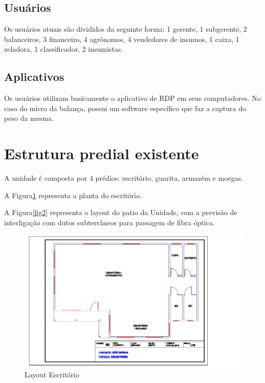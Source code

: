 \documentclass[	DIV=calc,%
							paper=a4,%
							fontsize=12pt,%
							onecolumn]{scrartcl}	 					%
\begin{document}
\subsection{Usuários}
Os usuários atuais são divididos da seguinte forma: 1 gerente, 1 subgerente, 2 balanceiros, 3 financeiro, 4 agrônomos, 4 vendedores de insumos, 1 caixa, 1 zeladora, 1 classificador, 2 insumistas.

\subsection{Aplicativos}
Os usuários utilizam basicamente o aplicativo de RDP em seus computadores. No caso do micro da balança, possui um software específico que faz a captura do peso da mesma.

\section{Estrutura predial existente}

A unidade é composta por 4 prédios: escritório, guarita, armazém e moegas.

A Figura\ref{fig1} representa a planta do escritório. 

A Figura\ref{fig2} representa o layout do patio da Unidade, com a previsão de interligação com dutos subterrâneos para passagem de fibra óptica.
\begin{figure}
	\centering
	\includegraphics[width=\textwidth]{fig1}
	\caption{Layout Escritório}
	\label{fig1}
\end{figure}
\end{document}
